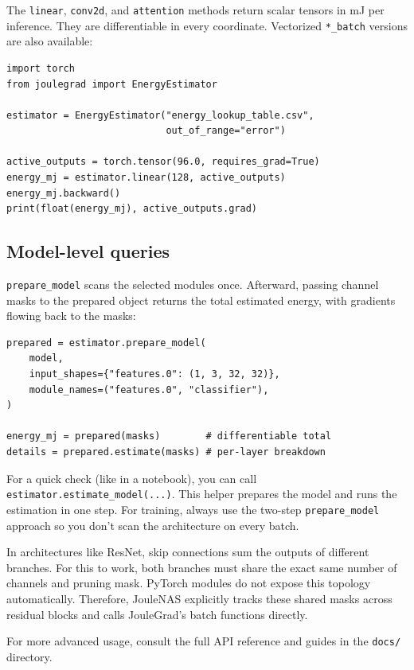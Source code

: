 The \texttt{linear}, \texttt{conv2d}, and \texttt{attention} methods return scalar tensors in mJ per inference. They are differentiable in every coordinate. Vectorized \texttt{*\_batch} versions are also available:

\begin{lstlisting}
import torch
from joulegrad import EnergyEstimator

estimator = EnergyEstimator("energy_lookup_table.csv",
                            out_of_range="error")

active_outputs = torch.tensor(96.0, requires_grad=True)
energy_mj = estimator.linear(128, active_outputs)
energy_mj.backward()
print(float(energy_mj), active_outputs.grad)
\end{lstlisting}

\subsection{Model-level queries}

\texttt{prepare\_model} scans the selected modules once. Afterward, passing channel masks to the prepared object returns the total estimated energy, with gradients flowing back to the masks:

\begin{lstlisting}
prepared = estimator.prepare_model(
    model,
    input_shapes={"features.0": (1, 3, 32, 32)},
    module_names=("features.0", "classifier"),
)

energy_mj = prepared(masks)        # differentiable total
details = prepared.estimate(masks) # per-layer breakdown
\end{lstlisting}

For a quick check (like in a notebook), you can call \texttt{estimator.}\allowbreak\texttt{estimate\_model(...)}. This helper prepares the model and runs the estimation in one step. For training, always use the two-step \texttt{prepare\_model} approach so you don't scan the architecture on every batch.

In architectures like ResNet, skip connections sum the outputs of different branches. For this to work, both branches must share the exact same number of channels and pruning mask. PyTorch modules do not expose this topology automatically. Therefore, JouleNAS explicitly tracks these shared masks across residual blocks and calls JouleGrad's batch functions directly.

For more advanced usage, consult the full API reference and guides in the \texttt{docs/} directory.
